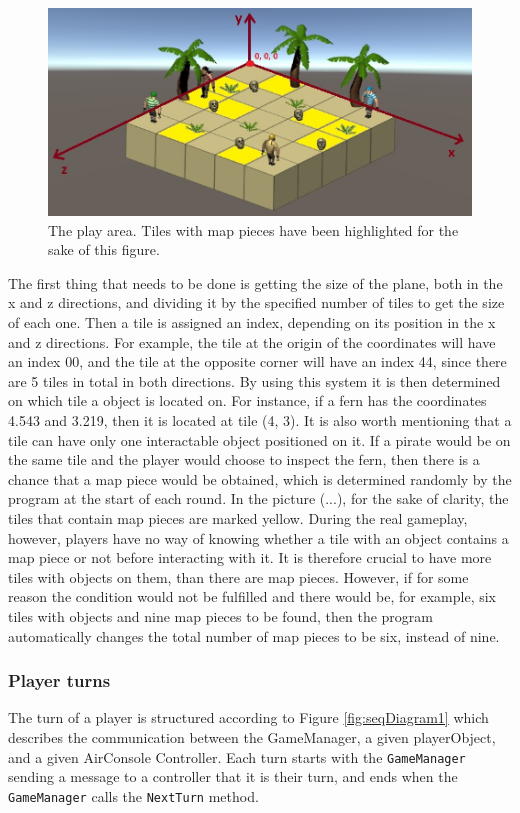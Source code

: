 \begin{figure}
	\centering
	\includegraphics[width=1\textwidth]{figures/mapFigure.jpg}
	\caption{The play area. Tiles with map pieces have been highlighted for the sake of this figure.\label{fig:playArea}}
\end{figure}

The first thing that needs to be done is getting the size of the plane, both in the x and z directions, and dividing it by the specified number of tiles to get the size of each one. Then a tile is assigned an index, depending on its position in the x and z directions. For example, the tile at the origin of the coordinates will have an index 00, and the tile at the opposite corner will have an index 44, since there are 5 tiles in total in both directions. By using this system it is then determined on which tile a object is located on. For instance, if a fern has the coordinates  4.543 and 3.219, then it is located at tile (4, 3). It is also worth mentioning that a tile can have only one interactable object positioned on it.  If a pirate would be on the same tile and the player would choose to inspect the fern, then there is a chance that a map piece would be obtained, which  is determined randomly by the program at the start of each round. In the picture (...), for the sake of clarity, the tiles that contain map pieces are marked yellow. During the real gameplay, however, players have no way of knowing whether a tile with an object contains a map piece or not before interacting with it. It is therefore crucial to have more tiles with objects on them, than there are map pieces. However, if for some reason the condition would not be fulfilled and there would be, for example, six tiles with objects and nine map pieces to be found, then the program automatically changes the total number of map pieces to be six, instead of nine.

\subsubsection{Player turns}
The turn of a player is structured according to Figure \ref{fig:seqDiagram1} which describes the communication between the GameManager, a given playerObject, and a given AirConsole Controller. Each turn starts with the \texttt{GameManager} sending a message to a controller that it is their turn, and ends when the \texttt{GameManager} calls the \texttt{NextTurn} method. 


